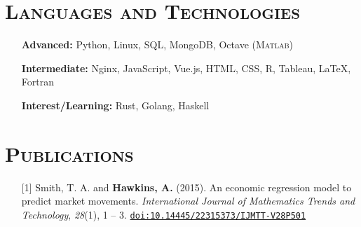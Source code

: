 \documentclass[10pt]{article}
\begin{document}
\section*{\textsc{Languages and Technologies}}
\begin{itemize}
    \item[] \textbf{Advanced:} Python, Linux, SQL, MongoDB, Octave (\textsc{Matlab})
    \item[] \textbf{Intermediate:} Nginx, JavaScript, Vue.js,  HTML, CSS, \textsc{R}, Tableau, \LaTeX{}, Fortran
    \item[] \textbf{Interest/Learning:} Rust, Golang, Haskell
\end{itemize}

\section*{\textsc{Publications}}
\begin{itemize}[leftmargin=*]
    \item[] [1] Smith, T. A. and \textbf{Hawkins, A.} (2015). An economic regression model to predict market movements. \textit{International Journal of Mathematics Trends and Technology}, \textit{28}(1), 1 -- 3. \texttt{\href{http://dx.doi.org/10.14445/22315373/IJMTT-V28P501}{doi:10.14445/22315373/IJMTT-V28P501}}
\end{itemize}
\end{document}
